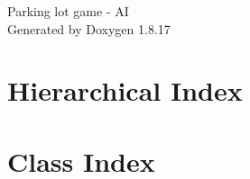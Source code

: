 \let\mypdfximage\pdfximage\def\pdfximage{\immediate\mypdfximage}\documentclass[twoside]{book}
\newcommand{\+}{\discretionary{\mbox{\scriptsize$\hookleftarrow$}}{}{}}
\newcommand{\clearemptydoublepage}{%
  \newpage{\pagestyle{empty}\cleardoublepage}%
}
\begin{document}
\hypersetup{pageanchor=false,
             bookmarksnumbered=true,
             pdfencoding=unicode
            }
\begin{titlepage}
\vspace*{7cm}
\begin{center}%
{\Large Parking lot game -\/ AI }\\
\vspace*{1cm}
{\large Generated by Doxygen 1.8.17}\\
\end{center}
\end{titlepage}
\clearemptydoublepage
{}
\tableofcontents
\clearemptydoublepage
{}
\hypersetup{pageanchor=true}

\chapter{Hierarchical Index}

\chapter{Class Index}

\end{document}
